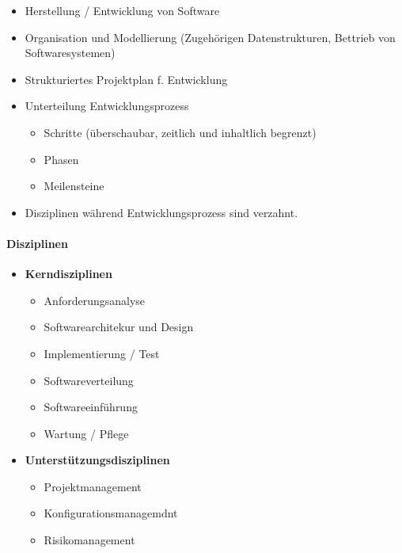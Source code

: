 \documentclass[../ZF_SWEN1.tex]{subfiles}
\begin{document}
\begin{itemize}
    \item Herstellung / Entwicklung von Software
    \item Organisation und Modellierung (Zugehörigen Datenstrukturen, Bettrieb von Softwaresystemen)
    \item Strukturiertes Projektplan f. Entwicklung
    \item Unterteilung Entwicklungsprozess
    \begin{itemize}
        \item Schritte (überschaubar, zeitlich und inhaltlich begrenzt)
        \item Phasen
        \item Meilensteine
    \end{itemize}
    \item Disziplinen während Entwicklungsprozess sind verzahnt.
    
\end{itemize}

\paragraph{Disziplinen}
\begin{itemize}
    \item \textbf{Kerndisziplinen}
    \begin{itemize}
        \item Anforderungsanalyse
        \item Softwarearchitekur und Design
        \item Implementierung / Test
        \item Softwareverteilung
        \item Softwareeinführung
        \item Wartung / Pflege
    \end{itemize}
    \item \textbf{Unterstützungsdisziplinen}
    \begin{itemize}
        \item Projektmanagement
        \item Konfigurationsmanagemdnt
        \item Risikomanagement
    \end{itemize}
\end{itemize}
\end{document}

